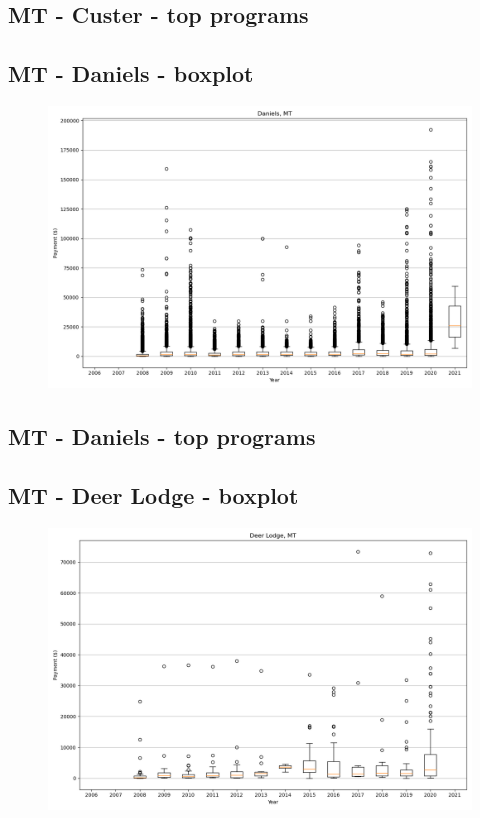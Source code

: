 \subsection*{MT - Custer - top programs}

\newpage
\subsection*{MT - Daniels - boxplot}
\begin{figure}[h]
\centering
\includegraphics[width=7in]{../output/boxplots/counties/Daniels-MT_boxplot.png}
\end{figure}


\subsection*{MT - Daniels - top programs}

\newpage
\subsection*{MT - Deer Lodge - boxplot}
\begin{figure}[h]
\centering
\includegraphics[width=7in]{../output/boxplots/counties/Deer Lodge-MT_boxplot.png}
\end{figure}


